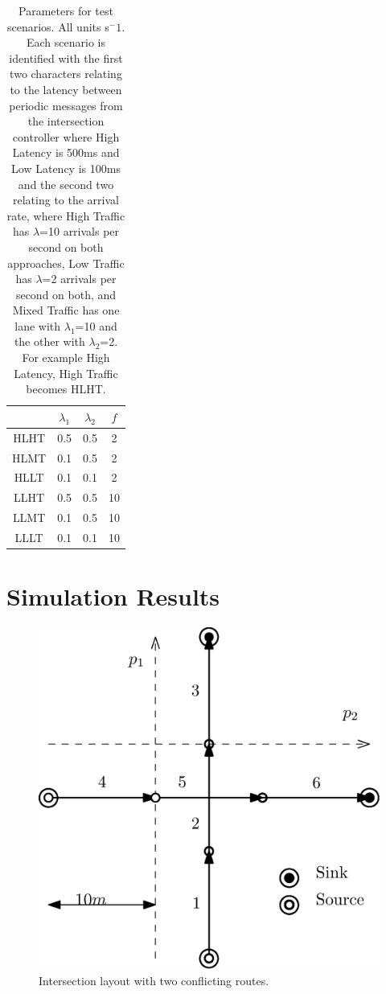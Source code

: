 \documentclass[]{article}
\begin{document}
\begin{table}
	\begin{tabular}{|c|c|c|c|}
		\hline
		& $\lambda_1$ & $\lambda_2$ & $f$ \\
		\hline
		HLHT & 0.5 & 0.5 & 2 \\
		HLMT & 0.1 & 0.5 & 2 \\
		HLLT & 0.1 & 0.1 & 2 \\
		LLHT & 0.5 & 0.5 & 10 \\
		LLMT & 0.1 & 0.5 & 10 \\
		LLLT & 0.1 & 0.1 & 10 \\
		\hline
	\end{tabular}
	\label{tab:params}
	\caption{Parameters for test scenarios. All units s$^-1$. Each scenario is identified with the first two characters relating to the latency between periodic messages from the intersection controller where High Latency is 500ms and  Low Latency is 100ms and the second two relating to the arrival rate, where High Traffic has $\lambda$=10 arrivals per second on both approaches, Low Traffic has $\lambda$=2 arrivals per second on both, and Mixed Traffic has one lane with $\lambda_1$=10 and the other with $\lambda_2$=2. For example High Latency, High Traffic becomes HLHT.}
\end{table}

\section{Simulation Results}

\begin{figure}[ht]
	\centering
	\includegraphics[width=0.9\linewidth]{intersection_topo}
	\caption{Intersection layout with two conflicting routes.}
	\label{fig:intersection_topo}
\end{figure}
\end{document}
